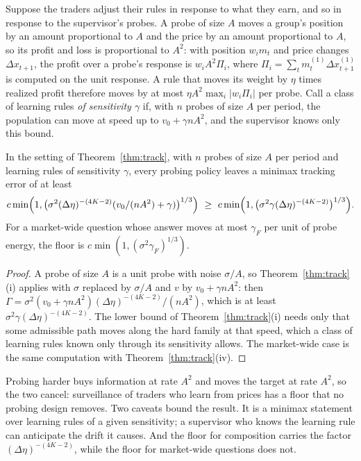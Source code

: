 Suppose the traders adjust their rules in response to what they earn, and so in response to the supervisor's probes. A probe of size $A$ moves a group's position by an amount proportional to $A$ and the price by an amount proportional to $A$, so its profit and loss is proportional to $A^2$: with position $w_im_t$ and price changes $\Delta x_{t+1}$, the profit over a probe's response is $w_iA^2\Pi_i$, where $\Pi_i=\sum_tm_t^{(1)}\Delta x_{t+1}^{(1)}$ is computed on the unit response. A rule that moves its weight by $\eta$ times realized profit therefore moves by at most $\eta A^2\max_i|w_i\Pi_i|$ per probe. Call a class of learning rules \emph{of sensitivity $\gamma$} if, with $n$ probes of size $A$ per period, the population can move at speed up to $v_0+\gamma nA^2$, and the supervisor knows only this bound.

\begin{proposition}\label{prop:observer}
In the setting of Theorem~\ref{thm:track}, with $n$ probes of size $A$ per period and learning rules of sensitivity $\gamma$, every probing policy leaves a minimax tracking error of at least
\[
 c\min\Bigl(1,\bigl(\sigma^2(\Delta\eta)^{-(4K-2)}(v_0/(nA^2)+\gamma)\bigr)^{1/3}\Bigr)\ \ge\ c\min\Bigl(1,\bigl(\sigma^2\gamma(\Delta\eta)^{-(4K-2)}\bigr)^{1/3}\Bigr).
\]
For a market-wide question whose answer moves at most $\gamma_F$ per unit of probe energy, the floor is $c\min(1,(\sigma^2\gamma_F)^{1/3})$.
\end{proposition}

\begin{proof}
A probe of size $A$ is a unit probe with noise $\sigma/A$, so Theorem~\ref{thm:track}(i) applies with $\sigma$ replaced by $\sigma/A$ and $v$ by $v_0+\gamma nA^2$: then $\Gamma=\sigma^2(v_0+\gamma nA^2)(\Delta\eta)^{-(4K-2)}/(nA^2)$, which is at least $\sigma^2\gamma(\Delta\eta)^{-(4K-2)}$. The lower bound of Theorem~\ref{thm:track}(i) needs only that some admissible path moves along the hard family at that speed, which a class of learning rules known only through its sensitivity allows. The market-wide case is the same computation with Theorem~\ref{thm:track}(iv).
\end{proof}

Probing harder buys information at rate $A^2$ and moves the target at rate $A^2$, so the two cancel: surveillance of traders who learn from prices has a floor that no probing design removes. Two caveats bound the result. It is a minimax statement over learning rules of a given sensitivity; a supervisor who knows the learning rule can anticipate the drift it causes. And the floor for composition carries the factor $(\Delta\eta)^{-(4K-2)}$, while the floor for market-wide questions does not.

